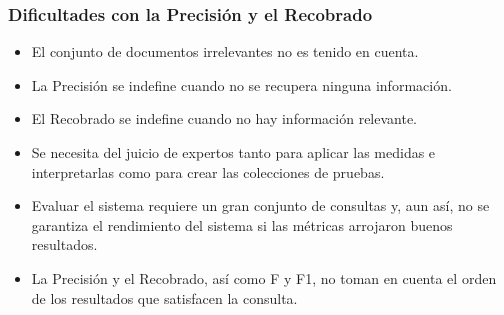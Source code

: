 \documentclass[
10pt, %
aspectratio=169, %
]{beamer}
\begin{document}
	\begin{frame}
		
		\frametitle{Dificultades con la Precisión y el Recobrado}
		
		\begin{itemize}
			\item El conjunto de documentos irrelevantes no es tenido en cuenta.
			
			\pause 
			
			\item La Precisión se indefine cuando no se recupera ninguna información.
			
			\item El  Recobrado se indefine cuando no hay información relevante.
			
			\pause 
			
			\item Se necesita del juicio de expertos tanto para aplicar las medidas e interpretarlas como para crear las colecciones de pruebas.
			
			\item Evaluar el sistema requiere un gran conjunto de consultas y, aun así, no se garantiza el rendimiento del sistema si las métricas arrojaron buenos resultados.
			
			\item La Precisión y el Recobrado, así como F y F1, no toman en cuenta el orden de los resultados que satisfacen la consulta.
		\end{itemize}
		
	\end{frame}
	
\end{document}
